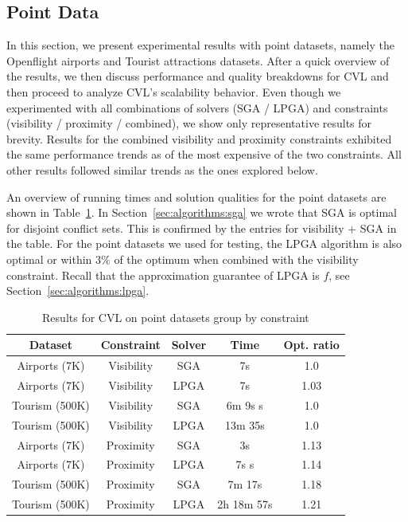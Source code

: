 \subsection{Point Data}
\label{sec:exp:points}

In this section, we present experimental results with point datasets, namely the Openflight airports and Tourist attractions datasets. After a quick overview of the results, we then discuss performance and quality breakdowns for CVL and then proceed to analyze CVL's scalability behavior. Even though we experimented with all combinations of solvers (SGA / LPGA) and constraints (visibility / proximity / combined), we show only representative results for brevity. Results for the combined visibility and proximity constraints exhibited the same performance trends as of the most expensive of the two constraints. All other results followed similar trends as the ones explored below. 


An overview of running times and solution qualities for the point datasets are shown in Table~\ref{tab:points:overview}. In Section~\ref{sec:algorithms:sga} we wrote that SGA is optimal for disjoint conflict sets. This is confirmed by the entries for visibility + SGA in the table. For the point datasets we used for testing, the LPGA algorithm is also optimal or within $3\%$ of the optimum when combined with the visibility constraint. Recall that the approximation guarantee of LPGA is $f$, see Section~\ref{sec:algorithms:lpga}.

\begin{table}[htdp]
\caption{Results for CVL on point datasets group by constraint}
\begin{center}
\begin{tabular}{|c|c|c|c|c|}
\hline
\textbf{Dataset} & \textbf{Constraint} & \textbf{Solver} & \textbf{Time} & \textbf{Opt. ratio}\\ 
\hline
Airports (7K) & Visibility & SGA & 7s & 1.0 \\
Airports (7K) & Visibility & LPGA & 7s & 1.03 \\
Tourism (500K) & Visibility & SGA & 6m 9s s & 1.0 \\
Tourism (500K) & Visibility & LPGA & 13m 35s & 1.0 \\
\hline
Airports (7K)  & Proximity  & SGA & 3s & 1.13 \\
Airports (7K)  & Proximity & LPGA & 7s s & 1.14 \\
Tourism (500K) & Proximity & SGA & 7m 17s & 1.18 \\
Tourism (500K) & Proximity & LPGA & 2h 18m 57s & 1.21 \\
\hline
\end{tabular}
\end{center}
\label{tab:points:overview}
\end{table}%

